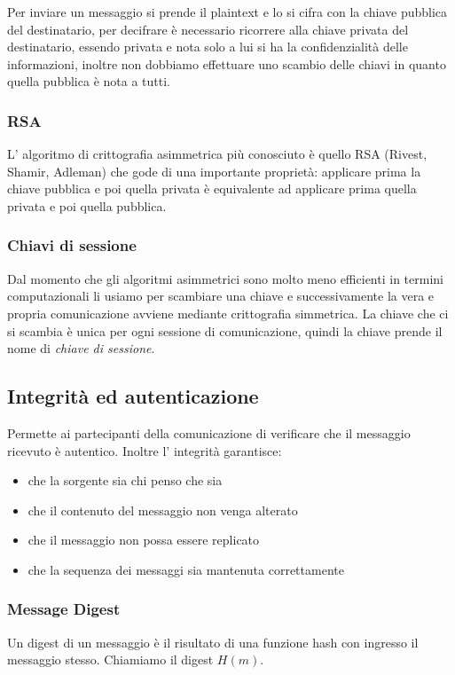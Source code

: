 Per inviare un messaggio si prende il plaintext e lo si cifra con la chiave pubblica del destinatario, per decifrare è necessario ricorrere alla chiave privata del destinatario, essendo privata e nota solo a lui si ha la confidenzialità delle informazioni, inoltre non dobbiamo effettuare uno scambio delle chiavi in quanto quella pubblica è nota a tutti.

\subsubsection{RSA}
L' algoritmo di crittografia asimmetrica più conosciuto è quello RSA (Rivest, Shamir, Adleman) che gode di una importante proprietà: applicare prima la chiave pubblica e poi quella privata è equivalente ad applicare prima quella privata e poi quella pubblica.

\subsubsection{Chiavi di sessione}
Dal momento che gli algoritmi asimmetrici sono molto meno efficienti in termini computazionali li usiamo per scambiare una chiave e successivamente la vera e propria comunicazione avviene mediante crittografia simmetrica.
La chiave che ci si scambia è unica per ogni sessione di comunicazione, quindi la chiave prende il nome di \emph{chiave di sessione}.

\subsection{Integrità ed autenticazione}
Permette ai partecipanti della comunicazione di verificare che il messaggio ricevuto è autentico.
Inoltre l' integrità garantisce:
\begin{itemize}
    \item che la sorgente sia chi penso che sia
    \item che il contenuto del messaggio non venga alterato
    \item che il messaggio non possa essere replicato
    \item che la sequenza dei messaggi sia mantenuta correttamente
\end{itemize}

\subsubsection{Message Digest}
Un digest di un messaggio è il risultato di una funzione hash con ingresso il messaggio stesso.
Chiamiamo il digest $H(m)$.


